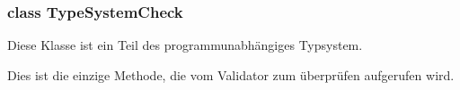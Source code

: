 \subsubsection{class TypeSystemCheck}

Diese Klasse ist ein Teil des programmunabhängiges Typsystem.

\begin{description}
		Dies ist die einzige Methode, die vom Validator zum überprüfen aufgerufen wird.
\end{description}
